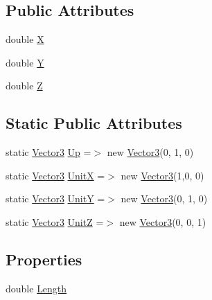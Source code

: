 \subsection*{Public Attributes}
\begin{DoxyCompactItemize}
\item 
double \mbox{\hyperlink{struct_eagle_eye_1_1_models_1_1_geometry_1_1_vector3_a9b1c87e7ebb769410216c7e91d84b3cf}{X}}
\item 
double \mbox{\hyperlink{struct_eagle_eye_1_1_models_1_1_geometry_1_1_vector3_a84a5669d5081daf71bd7edc719671a14}{Y}}
\item 
double \mbox{\hyperlink{struct_eagle_eye_1_1_models_1_1_geometry_1_1_vector3_a5a32f3442e6370b804d14cd2a7cc6ee6}{Z}}
\end{DoxyCompactItemize}
\subsection*{Static Public Attributes}
\begin{DoxyCompactItemize}
\item 
static \mbox{\hyperlink{struct_eagle_eye_1_1_models_1_1_geometry_1_1_vector3}{Vector3}} \mbox{\hyperlink{struct_eagle_eye_1_1_models_1_1_geometry_1_1_vector3_a2d8236562f23b63c4ac8163007bfda09}{Up}} =$>$ new \mbox{\hyperlink{struct_eagle_eye_1_1_models_1_1_geometry_1_1_vector3}{Vector3}}(0, 1, 0)
\item 
static \mbox{\hyperlink{struct_eagle_eye_1_1_models_1_1_geometry_1_1_vector3}{Vector3}} \mbox{\hyperlink{struct_eagle_eye_1_1_models_1_1_geometry_1_1_vector3_ada038e2f8c28fe2f27777c90d8c603d3}{UnitX}} =$>$ new \mbox{\hyperlink{struct_eagle_eye_1_1_models_1_1_geometry_1_1_vector3}{Vector3}}(1,0, 0)
\item 
static \mbox{\hyperlink{struct_eagle_eye_1_1_models_1_1_geometry_1_1_vector3}{Vector3}} \mbox{\hyperlink{struct_eagle_eye_1_1_models_1_1_geometry_1_1_vector3_a2a8457c8d9ee8236d141b803046d514b}{UnitY}} =$>$ new \mbox{\hyperlink{struct_eagle_eye_1_1_models_1_1_geometry_1_1_vector3}{Vector3}}(0, 1, 0)
\item 
static \mbox{\hyperlink{struct_eagle_eye_1_1_models_1_1_geometry_1_1_vector3}{Vector3}} \mbox{\hyperlink{struct_eagle_eye_1_1_models_1_1_geometry_1_1_vector3_ac5e4365ea15591cb195c8d90d443598a}{UnitZ}} =$>$ new \mbox{\hyperlink{struct_eagle_eye_1_1_models_1_1_geometry_1_1_vector3}{Vector3}}(0, 0, 1)
\end{DoxyCompactItemize}
\subsection*{Properties}
\begin{DoxyCompactItemize}
\item 
double \mbox{\hyperlink{struct_eagle_eye_1_1_models_1_1_geometry_1_1_vector3_ae07c4054aeaa56212a62d4da83c1949d}{Length}}
\end{DoxyCompactItemize}


